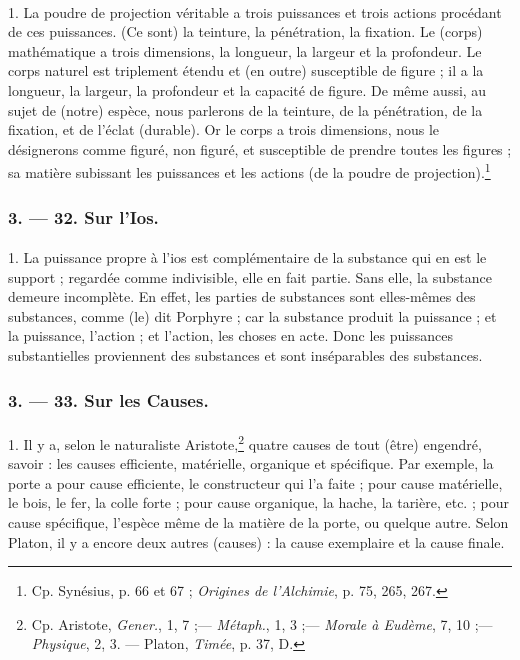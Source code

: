\documentclass[landscape, a4paper, 11pt, oneside, polutonikogreek, french]{article}
\begin{document}
\paragraph{}
1. La poudre de projection véritable a trois puissances et trois actions procédant de ces puissances. (Ce sont) la teinture, la pénétration, la fixation. Le (corps) mathématique a trois dimensions, la longueur, la largeur et la profondeur. Le corps naturel est triplement étendu et (en outre) susceptible de figure ; il a la longueur, la largeur, la profondeur et la capacité de figure. De même aussi, au sujet de (notre) espèce, nous parlerons de la teinture, de la pénétration, de la fixation, et de l'éclat (durable). Or le corps a trois dimensions, nous le désignerons comme figuré, non figuré, et susceptible de prendre toutes les figures ; sa matière subissant les puissances et les actions (de la poudre de projection).\footnote{Cp. Synésius, p. 66 et 67 ; \emph{Origines de l'Alchimie}, p. 75, 265, 267.}

\bigskip
\centerline{\EightStarTaper}
\centerline{\EightStarTaper\EightStarTaper}
\bigskip

\subsubsection{3. --- 32. Sur l'Ios.}
\paragraph{}
1. La puissance propre à l'ios est complémentaire de la substance qui en est le support ; regardée comme indivisible, elle en fait partie. Sans elle, la substance demeure incomplète. En effet, les parties de substances sont elles-mêmes des substances, comme (le) dit Porphyre ; car la substance produit la puissance ; et la puissance, l'action ; et l'action, les choses en acte. Donc les puissances substantielles proviennent des substances et sont inséparables des substances.
\clearpage
\bigskip
\centerline{\EightStarTaper}
\centerline{\EightStarTaper\EightStarTaper}
\bigskip

\subsubsection{3. --- 33. Sur les Causes.}
\paragraph{}
1. Il y a, selon le naturaliste Aristote,\footnote{Cp. Aristote, \emph{Gener.}, 1, 7 ;--- \emph{Métaph.}, 1, 3 ;--- \emph{Morale à Eudème}, 7, 10 ;--- \emph{Physique}, 2, 3. --- Platon, \emph{Timée}, p. 37, D.} quatre causes de tout (être) engendré, savoir : les causes efficiente, matérielle, organique et spécifique. Par exemple, la porte a pour cause efficiente, le constructeur qui l'a faite ; pour cause matérielle, le bois, le fer, la colle forte ; pour cause organique, la hache, la tarière, etc. ; pour cause spécifique, l'espèce même de la matière de la porte, ou quelque autre. Selon Platon, il y a encore deux autres (causes) : la cause exemplaire et la cause finale.
\end{document}
